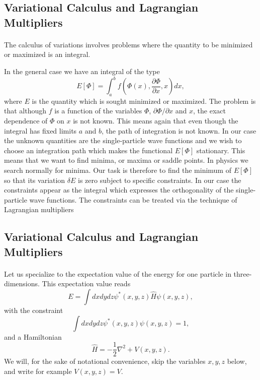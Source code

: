 \documentclass[%
twoside,                 %
final,                   %
10pt]{article}
\begin{document}
\subsection*{Variational Calculus and Lagrangian Multipliers}

\paragraph{}
The calculus of variations involves 
problems where the quantity to be minimized or maximized is an integral. 

In the general case we have an integral of the type
\[ 
E[\Phi]= \int_a^b f(\Phi(x),\frac{\partial \Phi}{\partial x},x)dx,
\]
where $E$ is the quantity which is sought minimized or maximized.
The problem is that although $f$ is a function of the variables $\Phi$, $\partial \Phi/\partial x$ and $x$, the exact dependence of
$\Phi$ on $x$ is not known.  This means again that even though the integral has fixed limits $a$ and $b$, the path of integration is
not known. In our case the unknown quantities are the single-particle wave functions and we wish to choose an integration path which makes
the functional $E[\Phi]$ stationary. This means that we want to find minima, or maxima or saddle points. In physics we search normally for minima.
Our task is therefore to find the minimum of $E[\Phi]$ so that its variation $\delta E$ is zero  subject to specific
constraints. In our case the constraints appear as the integral which expresses the orthogonality of the  single-particle wave functions.
The constraints can be treated via the technique of Lagrangian multipliers




\subsection*{Variational Calculus and Lagrangian Multipliers}

\paragraph{}
Let us specialize to the expectation value of the energy for one particle in three-dimensions.
This expectation value reads
\[
  E=\int dxdydz \psi^*(x,y,z) \hat{H} \psi(x,y,z),
\]
with the constraint
\[
 \int dxdydz \psi^*(x,y,z) \psi(x,y,z)=1,
\]
and a Hamiltonian
\[
\hat{H}=-\frac{1}{2}\nabla^2+V(x,y,z).
\]
We will, for the sake of notational convenience,  skip the variables $x,y,z$ below, and write for example $V(x,y,z)=V$.
\end{document}
